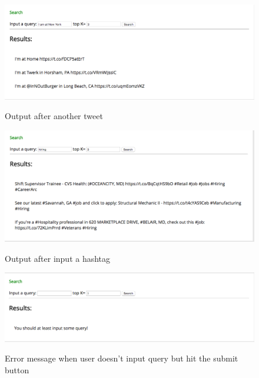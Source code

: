\documentclass[10pt]{article}
\begin{document}
\begin{figure}[h]
	\caption{Output after another tweet}
	\centering
	\includegraphics[scale=0.3]{Screen_Shot_3.png}
	\label{fig3}
\end{figure}

\begin{figure}[h]
	\caption{Output after input a hashtag}
	\centering
	\includegraphics[scale=0.3]{Screen_Shot_4.png}
	\label{fig4}
\end{figure}

\begin{figure}[h]
	\caption{Error message when user doesn't input query but hit the submit button }
	\centering
	\includegraphics[scale=0.3]{Screen_Shot_5.png}
	\label{fig5}
\end{figure}
\end{document}

